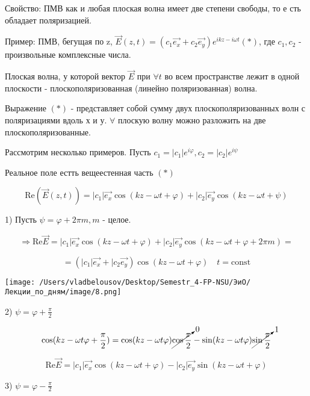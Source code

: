 \documentclass[12pt, a4paper]{report}
\begin{document}
\fi


Свойство: ПМВ как и любая плоская волна имеет две степени свободы, то е сть обладает поляризацией.

Пример: ПМВ, бегущая по z, \( \vec{E}( z,t)= ( c_1 \vec{e_x}+ c_2 \vec{e_y} )e^{ikz- i \omega t}  (*) \), где \( c_1, c_2 \) - произвольные комплексные числа.

\begin{definition}
    Плоская волна, у которой вектор \( \vec{E} \) при \( \forall t \) во всем пространстве лежит в одной плоскости - плоскополяризованная (линейно поляризованная) волна.
\end{definition}

Выражение \( (*) \) - представляет собой сумму двух плоскополяризованных волн с поляризациями вдоль х и у. \( \forall  \)  плоскую волну можно разложить на две плоскополяризованные.

Рассмотрим несколько примеров. Пусть \( c_1= |c_1|e^{i \varphi} , c_2= |c_2|e^{ i \psi }  \) 

Реальное поле естть вещеестенная часть \( (*) \) 

\[ \mathrm{Re} ( \vec{E}(z,t))= |c_1|\vec{e_x}\cos (kz - \omega t + \varphi) + |c_2|\vec{e_y}\cos (kz - \omega t + \psi)   \] 

1) Пусть \( \psi = \varphi + 2 \pi m, m  \) - целое. 

\[ \Rightarrow \mathrm{Re}\vec{E }= |c_1|\vec{e_x}\cos (kz - \omega t + \varphi) + |c_2|\vec{e_y}\cos (kz - \omega t + \varphi + 2 \pi m)=   \]

\[= (|c_1| \vec{e_x} + |c_2\vec{e_y}) \cos (kz - \omega t + \varphi ) \quad  t = \mathrm{const}    \] 

\begin{center}
    \texttt{[image: /Users/vladbelousov/Desktop/Semestr\_4-FP-NSU/ЭиО/Лекции\_по\_дням/image/8.png]}
\end{center}

2) \(\displaystyle  \psi = \varphi +\frac{\pi}{2}    \) 

\[ \cos  ( kz - \omega t \varphi+ \frac{\pi}{2} )= \cos( kz - \omega t \varphi)\cancelto{0}{\cos \frac{\pi}{2}} -\sin( kz - \omega t \varphi)\cancelto{1}{\sin  \frac{\pi}{2}}   \] 

\[ \mathrm{Re}\vec{E }= |c_1|\vec{e_x}\cos ( kz - \omega t + \varphi)  - |c_2|\vec{e_y}\sin( kz - \omega t + \varphi)   \] 

3) \( \displaystyle \psi=\varphi - \frac{\pi}{2}  \) 
\end{document}
